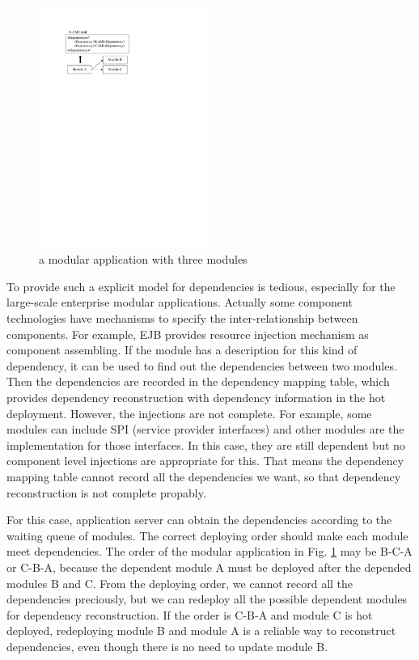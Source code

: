 \documentclass[conference]{IEEEtran}
\begin{document}
\begin{figure}[ht]
\centering
\includegraphics[width=2.2in]{ExampleThree.pdf}
\caption{a modular application with three modules}
\label{fig:example_abc}
\end{figure}


To provide such a explicit model for dependencies is tedious, especially for the large-scale enterprise modular applications. Actually some component technologies have mechanisms to specify the inter-relationship between components. For example, EJB provides resource injection mechanism\cite{DI} as component assembling. If the module has a description for this kind of dependency, it can be used to find out the dependencies between two modules. Then the dependencies are recorded in the dependency mapping table, which provides dependency reconstruction with dependency information in the hot deployment.
However, the injections are not complete. For example, some modules can include SPI (service provider interfaces) and other modules are the implementation for those interfaces. In this case, they are still dependent but no component level injections are appropriate for this. That means the dependency mapping table cannot record all the dependencies we want, so that dependency reconstruction is not complete propably.

For this case, application server can obtain the dependencies according to the waiting queue of modules. The correct deploying order should make each module meet dependencies. The order of the modular application in Fig. \ref{fig:example_abc} may be B-C-A or C-B-A, because the dependent module A must be deployed after the depended modules B and C. From the deploying order, we cannot record all the dependencies preciously, but we can redeploy all the possible dependent modules for dependency reconstruction. If the order is C-B-A and module C is hot deployed, redeploying module B and module A is a reliable way to reconstruct dependencies, even though there is no need to update module B.
\end{document}
